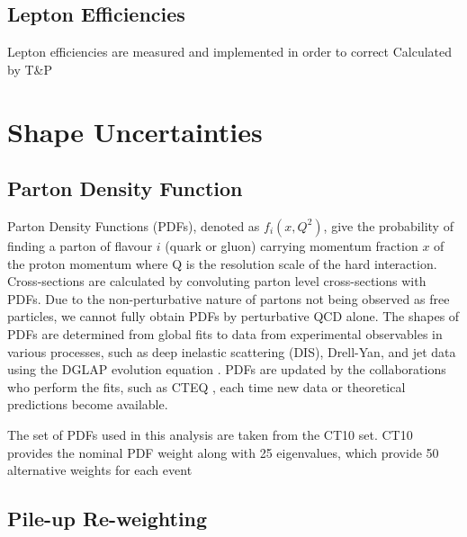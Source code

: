 \subsection{Lepton Efficiencies} \label{subsec-LeptonEfficiencies}

Lepton efficiencies are measured and implemented in order to correct
Calculated by T&P

\section{Shape Uncertainties} \label{sec-ShapeUncertainties}

\subsection{Parton Density Function} \label{subsec-PDFUncertainties}

Parton Density Functions (PDFs), denoted as $f_i(x, Q^2)$, give the probability of finding a parton of flavour $i$ (quark or gluon) carrying momentum fraction $x$ of the proton momentum where Q is the resolution scale of the hard interaction. Cross-sections are calculated by convoluting parton level cross-sections with PDFs. Due to the non-perturbative nature of partons not being observed as free particles, we cannot fully obtain PDFs by perturbative QCD alone. The shapes of PDFs are determined from global fits to data from experimental observables in various processes, such as deep inelastic scattering (DIS), Drell-Yan, and jet data using the DGLAP evolution equation \cite{Vogt:2004mw}. PDFs are updated by the collaborations who perform the fits, such as CTEQ \cite{PhysRevD.78.013004}, each time new data or theoretical predictions become available.

The set of PDFs used in this analysis are taken from the CT10 \cite{PhysRevD.89.033009} set. CT10 provides the nominal PDF weight along with 25 eigenvalues, which provide 50 alternative weights for each event



\subsection{Pile-up Re-weighting} \label{subsec-PUReweightingUncertainties}

